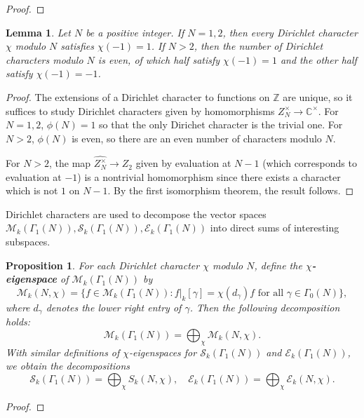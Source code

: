 \documentclass[10pt,leqno,twoside]{article}
\theoremstyle{plain}
\newtheorem{lemma}[lem]{Lemma}
\newtheorem{proposition}[lem]{Proposition}
\theoremstyle{definition}
\numberwithin{equation}{section}
\numberwithin{lem}{section}
\newcommand{\textib}[1]{\textbf{\textit{#1\index{#1}}}} %
\newcommand{\tbd}{{\Huge\color{red}{\textib{TO DO}}}}
\begin{document}
\begin{proof}
    \tbd
\end{proof}
\begin{lemma}
    Let $N$ be a positive integer. If $N = 1,2$, then every Dirichlet character $\chi$ modulo $N$ satisfies $\chi(-1)=1$. If $N>2$, then the number of Dirichlet characters modulo $N$ is even, of which half satisfy $\chi(-1) = 1$ and the other half satisfy $\chi(-1) = -1$.
\end{lemma}
\begin{proof}
    The extensions of a Dirichlet character to functions on $\mathbb Z$ are unique, so it suffices to study Dirichlet characters given by homomorphisms $Z_N^\times\to\mathbb C^\times$. For $N = 1,2$, $\phi(N) = 1$ so that the only Dirichet character is the trivial one. For $N>2$, $\phi(N)$ is even, so there are an even number of characters modulo $N$.

    For $N>2$, the map $\widehat{Z_N^\times}\to Z_2$ given by evaluation at $N-1$ (which corresponds to evaluation at $-1$) is a nontrivial homomorphism since there exists a character which is not $1$ on $N-1$. By the first isomorphism theorem, the result follows.
\end{proof}
Dirichlet characters are used to decompose the vector spaces $\mathcal M_k(\varGamma_1(N)), \mathcal S_k(\varGamma_1(N)), \mathcal E_k(\varGamma_1(N))$ into direct sums of interesting subspaces.
\begin{proposition}\label{prop: eigenspace decomp}
    For each Dirichlet character $\chi$ modulo $N$, define the \textib{$\chi$-eigenspace} of $\mathcal M_k(\varGamma_1(N))$ by 
    \[\mathcal M_k(N,\chi) = \{f\in \mathcal M_k(\varGamma_1(N)) : f|_k[\gamma] = \chi(d_\gamma)f \text{ for all } \gamma\in\varGamma_0(N)\},\] where $d_\gamma$ denotes the lower right entry of $\gamma$. Then the following decomposition holds:
    \[\mathcal M_k(\varGamma_1(N)) = \bigoplus_\chi\mathcal M_k(N,\chi).\] With similar definitions of $\chi$-eigenspaces for $\mathcal S_k(\varGamma_1(N))$ and $\mathcal E_k(\varGamma_1(N))$, we obtain the decompositions
    \[\mathcal S_k(\varGamma_1(N)) = \bigoplus_\chi S_k(N,\chi),\quad \mathcal E_k(\varGamma_1(N)) = \bigoplus_\chi \mathcal E_k(N,\chi).\]
\end{proposition}
\begin{proof}
    \tbd 
\end{proof}
\end{document}

